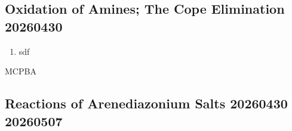 \subsection{Oxidation of Amines; The Cope Elimination 20260430}

\begin{enumerate}
    \item sdf
\end{enumerate}

\begin{example} %
    MCPBA
\end{example}

\subsection{Reactions of Arenediazonium Salts 20260430 20260507}

